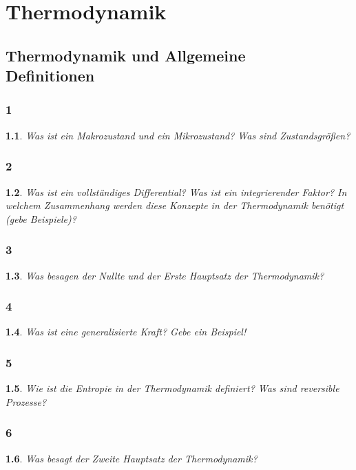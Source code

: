 \documentclass[12pt,a4paper]{report}
\author{\theauthor}
\title{\thetitle}
\newtheorem{myfrag}{}%
\begin{document}
\maketitle%
\tableofcontents%
\chapter{Thermodynamik}
\section{Thermodynamik und Allgemeine\\Definitionen}
\subsection{1}
\begin{myfrag}
Was ist ein Makrozustand und ein Mikrozustand?
Was sind Zustandsgrößen?
\end{myfrag}
\subsection{2}
\begin{myfrag}
Was ist ein vollständiges Differential? Was ist ein integrierender Faktor?
In welchem Zusammenhang werden diese Konzepte in der
Thermodynamik benötigt (gebe Beispiele)?
\end{myfrag}
\subsection{3}
\begin{myfrag}
Was besagen der Nullte und der Erste Hauptsatz der Thermodynamik?
\end{myfrag}
\subsection{4}
\begin{myfrag}
Was ist eine generalisierte Kraft? Gebe ein Beispiel!
\end{myfrag}
\subsection{5}
\begin{myfrag}
Wie ist die Entropie in der Thermodynamik definiert? Was sind
reversible Prozesse?
\end{myfrag}
\subsection{6}
\begin{myfrag}
Was besagt der Zweite Hauptsatz der Thermodynamik?
\end{myfrag}
\end{document}
